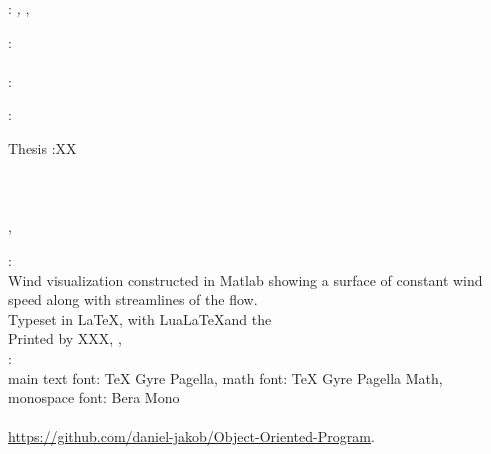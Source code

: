 \thispagestyle{empty}

\hfill

\vfill

\noindent\myName: \textit{\myTitle,} \mySubtitle, %
\textcopyright\ ~

\bigskip

\noindent{}: \\
\myProf \\

\noindent{}: \\
\myCollaborator


\noindent{}:\\
\myExaminer

\bigskip
\noindent\myDegree Thesis :XX\\
\noindent\myDepartment\\
\noindent\myFaculty\\
\noindent\myUni\\
\noindent\myLocation, \myCountry

\vfill


\noindent{}: \\
Wind visualization constructed in Matlab showing a surface of constant wind speed along with streamlines of the flow.\\
\medskip
\noindent Typeset in \LaTeX, with Lua\LaTeX{}and the \ctVersion\\
\noindent Printed by XXX, , \myPrintLocation\\
\noindent{}: \\
\noindent main text font: TeX Gyre Pagella, math font: TeX Gyre Pagella Math, monospace font: Bera Mono\\
\noindent{}\\
\url{https://github.com/daniel-jakob/Object-Oriented-Program}.
